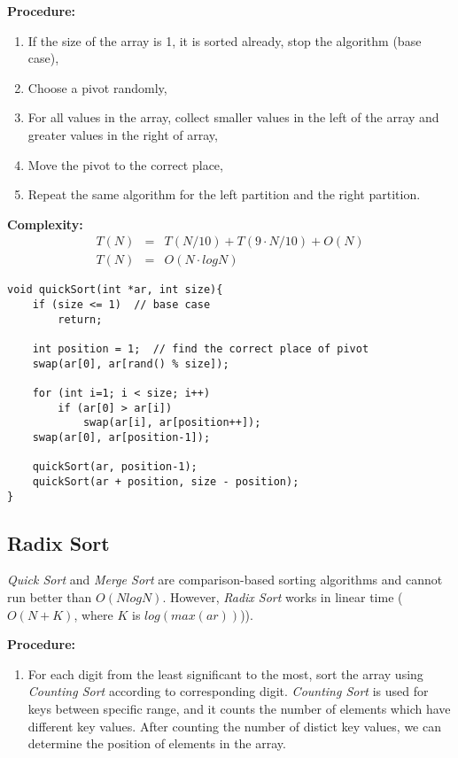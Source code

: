 \documentclass[12pt]{article}
\begin{document}
\textbf{Procedure: }
\begin{enumerate}
	\item If the size of the array is 1, it is sorted already, stop the algorithm (base case),
	\item Choose a pivot randomly,
	\item For all values in the array, collect smaller values in the left of the array and greater values in the right of array,
	\item Move the pivot to the correct place,
	\item Repeat the same algorithm for the left partition and the right partition.
\end{enumerate}	

\textbf{Complexity: }
\begin{eqnarray*}
	T(N) &=& T(N / 10) + T(9\cdot N / 10) + O(N) \\
	T(N) &=& O(N \cdot logN)
\end{eqnarray*}
		
\begin{verbatim}
void quickSort(int *ar, int size){
    if (size <= 1)  // base case
        return;
	
    int position = 1;  // find the correct place of pivot
    swap(ar[0], ar[rand() % size]);
	
    for (int i=1; i < size; i++)
        if (ar[0] > ar[i])
            swap(ar[i], ar[position++]);
    swap(ar[0], ar[position-1]);
	
    quickSort(ar, position-1);
    quickSort(ar + position, size - position);
}
\end{verbatim}


\cleardoublepage
		\subsection{Radix Sort}

	\textit{Quick Sort} and \textit{Merge Sort} are comparison-based sorting algorithms and cannot run better than $O(Nlog N)$. However, \textit{Radix Sort} works in linear time ($O(N + K)$, where $K$ is $log(max(ar))$)).

\textbf{Procedure: }
\begin{enumerate}
	\item For each digit from the least significant to the most, sort the array using \textit{Counting Sort} according to corresponding digit. \textit{Counting Sort} is used for keys between specific range, and it counts the number of elements which have different key values. After counting the number of distict key values, we can determine the position of elements in the array. 
\end{enumerate}	
\end{document}
